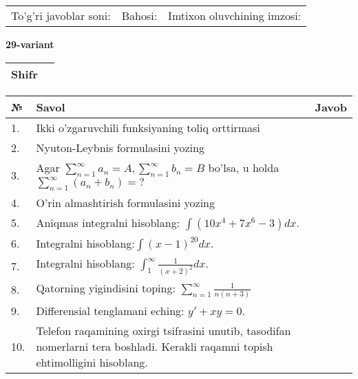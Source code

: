 \documentclass{article}
\begin{document}
  \vspace{1cm}
  
  \begin{tabular}{lll}
  To'g'ri javoblar soni: \underline{\hspace{1.5cm}} & 
  Bahosi: \underline{\hspace{1.5cm}} & 
  Imtixon oluvchining imzosi: \underline{\hspace{2cm}} \\
  \end{tabular}
  
  \egroup
  
  \newpage
  
  
  \textbf{29-variant}\\
  
  \bgroup
  \def\arraystretch{1.6} %
  
  \begin{tabular}{|m{5.7cm}|m{9.5cm}|}
  \hline
  Shifr & \\
  \hline
  \end{tabular}
  
  \vspace{1cm}
  
  \begin{tabular}{|m{0.7cm}|m{10cm}|m{4cm}|}
  \hline
  № & Savol & Javob \\
  \hline
  1. & Ikki o'zgaruvchili funksiyaning toliq orttirmasi &  \\
  \hline
  2. & Nyuton-Leybnis formulasini yozing &  \\
  \hline
  3. & Agar \(\sum_{n = 1}^{\infty}a_{n} = A,\sum_{n = 1}^{\infty}b_{n} = B\) bo'lsa, u holda \(\sum_{n = 1}^{\infty}\left( a_{n} + b_{n} \right) = ?\) &  \\
  \hline
  4. & O'rin almashtirish formulasini yozing &  \\
  \hline
  5. & Aniqmas integralni hisoblang: \(\int {\left( 10x^{4} + 7x^{6} - 3 \right)dx}\). &  \\
  \hline
  6. & Integralni hisoblang:\(\int {(x - 1)^{20}}dx\). &  \\
  \hline
  7. & Integralni hisoblang: \(\int_{1}^{\infty}{\frac{1}{(x + 2)^{2}}dx}\). &  \\
  \hline
  8. & Qatorning yigindisini toping: \(\sum_{n = 1}^{\infty}\frac{1}{n(n + 3)}\) &  \\
  \hline
  9. & Differensial tenglamani eching: \(y' + xy = 0\). &  \\
  \hline
  10. & Telefon raqamining oxirgi tsifrasini unutib, tasodifan nomerlarni tera boshladi. Kerakli raqamni topish ehtimolligini hisoblang. &  \\
  \hline
  \end{tabular}
  
\end{document}
